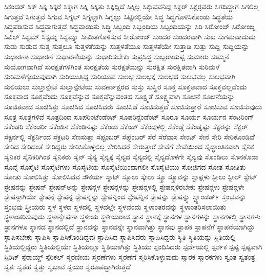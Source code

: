 {ಸಿಕಂದರ್
ಸಿಕ್
ಸಿಕ್ಕ
ಸಿಕ್ಕರೆ
ಸಿಕ್ಕಾಗ
ಸಿಕ್ಕಿ
ಸಿಕ್ಕಿತು
ಸಿಕ್ಕಿದ್ದಿದೆ
ಸಿಕ್ಕಿಲ್ಲ
ಸಿಕ್ಕುವವನಿದ್ದ
ಸಿಕ್ದರ್
ಸಿಕ್ದರ್ರವರು
ಸಿಗದಿದ್ದಾಗ
ಸಿಗಲಿಲ್ಲ
ಸಿಗುತ್ತದೆ
ಸಿಗುತ್ತವೆ
ಸಿಗುವ
ಸಿಗ್ನಲ್
ಸಿಗ್ನಲ್ಗಾಗಿ
ಸಿಗ್ನಲ್ಲು
ಸಿಟ್ಟಿನಲ್ಲಿಯೇ
ಸಿದ್ಧ
ಸಿದ್ಧಗೊಳಿಸಿಕೊಂಡು
ಸಿದ್ಧತೆಯ
ಸಿದ್ಧಪಡಿಸುವ
ಸಿದ್ಧವಾಗುತ್ತದೆ
ಸಿದ್ಧವಾಯಿತು
ಸಿದ್ಧಿ
ಸಿಬ್ಬಂದಿ
ಸಿಬ್ಬಂದಿಯ
ಸಿಬ್ಬಂದಿಯನ್ನು
ಸಿರಿ
ಸಿರೋಂಜ್
ಸಿರೋಂಜ್ನ
ಸಿವಿಲ್
ಸಿಸ್ಟಮ್
ಸಿಸ್ಟಮ್ನ
ಸಿಸ್ಟಮ್ನ್ನು
ಸೀಮಿತಗೊಳಿಸುವ
ಸೀರೋಂಜ್
ಸುಂದರ
ಸುಂದರವಾಗಿ
ಸುಖ
ಸುಗಮವಾದುದು
ಸುಡು
ಸುಡುವ
ಸುತ್ತ
ಸುತ್ತಲೂ
ಸುತ್ತಳತೆಯನ್ನು
ಸುತ್ತಳತೆಯೂ
ಸುತ್ತಳತೆಯೇ
ಸುತ್ತಾಡಿ
ಸುತ್ತು
ಸುದ್ದಿ
ಸುದ್ದಿಯನ್ನು
ಸುಧಾರಣಾ
ಸುಧಾರಣೆ
ಸುಧಾರಣೆೆಯನ್ನು
ಸುಧಾರಿಸಬೇಕು
ಸುಪ್ರಸಿದ್ಧ
ಸುಬ್ಬರಾಯಪ್ಪ
ಸುಮಾರು
ಸುಮ್ಮನೆ
ಸುಯೋಗವಾಗಿದೆ
ಸುರಕ್ಷತೆಗಳಿಗಿಂತ
ಸುರಕ್ಷತೆಯ
ಸುರಕ್ಷತೆಯನ್ನು
ಸುರಕ್ಷಿತ
ಸುರಕ್ಷಿತವಾಗಿ
ಸುರಿಮಳೆ
ಸುರಿಮಳೆಗೈಯುವುದಾಗಿ
ಸುರಿಯುತ್ತಿದ್ದ
ಸುರಿಯುವ
ಸುಲಭ
ಸುಲಭಕ್ಕೆ
ಸುಲಭದ
ಸುಲಭವಲ್ಲ
ಸುಲಭವಾಗಿ
ಸುಲಿಯಲು
ಸುಲ್ತಾನ್ಪೇಟೆ
ಸುಲ್ತಾನ್ಪೇಟೆಯ
ಸುವರ್ಣಾಕ್ಷರದ
ಸುಸ್ತು
ಸುಸ್ಥಿರ
ಸೂಕ್ತ
ಸೂಕ್ತಅವಾದ
ಸೂಕ್ತವಲ್ಲವೆಂದು
ಸೂಕ್ತವಾದ
ಸೂಕ್ತವೆಂದು
ಸೂಕ್ತವೆನ್ನುವ
ಸೂಕ್ತವೆನ್ನುವಂತಹ
ಸೂಕ್ಷ್ಮತೆ
ಸೂಕ್ಷ್ಮವಾಗಿ
ಸೂಚನೆ
ಸೂಚನೆಯನ್ನು
ಸೂಚಿತವಾದ
ಸೂಚಿಸಿತ್ತು
ಸೂಚಿಸಿದ
ಸೂಚಿಸಿದರು
ಸೂಚಿಸಿದೆ
ಸೂಚಿಸುತ್ತದೆ
ಸೂಚಿಸುತ್ತಾರೆ
ಸೂಚಿಸುವ
ಸೂಚಿಸುವುದು
ಸೂತ್ರ
ಸೂತ್ರಗಳಿವೆ
ಸೂತ್ರದಿಂದ
ಸೂಪರಿಂಟೆಂಡೆಂಟ್
ಸೂಪರಿನ್ಟೆಂಡೆಂಟ್
ಸೂರೂ
ಸೂರ್ಯ
ಸೂರ್ಯನ
ಸೆಂಟರಿಂಗ್
ಸೆಕೆಂಡರಿ
ಸೆಕೆಂಡರೀ
ಸೆಕೆಂಡಿನ
ಸೆಕೆಂಡಿನಷ್ಟು
ಸೆಕೆಂಡು
ಸೆಕೆಂಡ್
ಸೆಕೆಂಡ್ಗಳಲ್ಲಿ
ಸೆಕೆಂಡ್ಗೆ
ಸೆಕೆಂಡ್ನಷ್ಟು
ಸೆಕ್ಟರನ್ನು
ಸೆಕ್ಟರ್
ಸೆಕ್ಟರ್ನಲ್ಲಿ
ಸೆಕ್ಟರ್ನಿಂದ
ಸೆಕ್ರಟರಿ
ಸೆಣಸುತ್ತಾ
ಸೆಪ್ಟಂಬರ್
ಸೆಪ್ಟೆಂಬರ್
ಸೆರೆ
ಸೆರೆವಾಸ
ಸೇಂಟ್
ಸೇನೆ
ಸೇರಿ
ಸೇರಿಕೊಂಡಿವೆೆ
ಸೇರಿದ
ಸೇರಿದಂತೆ
ಸೇರಿದ್ದರು
ಸೇರಿಸಿಕೊಳ್ಳಲಿಲ್ಲ
ಸೇರಿಸಿದರೆ
ಸೇರುತ್ತಾರೆ
ಸೇವೆಗೆ
ಸೇವೆಯಿಂದ
ಸೈದ್ಧಾಂತಿಕವಾಗಿ
ಸೈನಿಕ
ಸೈನಿಕರ
ಸೈನಿಕರಿಗಿಂತ
ಸೈನಿಕರು
ಸೈನ್
ಸೈನ್ಯ
ಸೈನ್ಯಕ್ಕೆ
ಸೈನ್ಯದ
ಸೈನ್ಯದಲ್ಲಿ
ಸೈನ್ಯದೊಳಗೇ
ಸೈನ್ಯವು
ಸೊಂಡಿಲು
ಸೊನಕೊಡಾ
ಸೊನ್ನೆ
ಸೊಸೈಟಿ
ಸೊಸೈಟಿಗಳು
ಸೊಸೈಟಿಯ
ಸೊಸೈಟಿಯಿಂದಾಗಲೀ
ಸೊಸೈಟಿಯು
ಸೋಜಿಗದ
ಸೋತ
ಸೋತಿತು
ಸೋತು
ಸೋಲಿಸಿತ್ತು
ಸೋಲಿಸಿದವ
ಸೌಕರ್ಯ
ಸ್ಕಾಟ್
ಸ್ಕೂಲು
ಸ್ಕೇಲು
ಸ್ಕ್ರೂ
ಸ್ಕ್ರೂವನ್ನು
ಸ್ಟಾಫ್ಗಳು
ಸ್ಟೀಲು
ಸ್ಟೀಲ್
ಸ್ಟೇಟ್
ಸ್ಟೇಷನನ್ನು
ಸ್ಟೇಷನ್
ಸ್ಟೇಷನ್ಅನ್ನು
ಸ್ಟೇಷನ್ಗಳ
ಸ್ಟೇಷನ್ಗಳನ್ನು
ಸ್ಟೇಷನ್ಗಳಲ್ಲಿ
ಸ್ಟೇಷನ್ಗಳಿರಬೇಕು
ಸ್ಟೇಷನ್ಗಳು
ಸ್ಟೇಷನ್ಗಳೇ
ಸ್ಟೇಷನ್ಗಾಗಿಯೇ
ಸ್ಟೇಷನ್ಗೆ
ಸ್ಟೇಷನ್ನ
ಸ್ಟೇಷನ್ನನ್ನು
ಸ್ಟೇಷನ್ನಿಂದ
ಸ್ಟೇಷನ್ನಿನ
ಸ್ಟೇಷನ್ನು
ಸ್ಟೇಷನ್ನ್ನು
ಸ್ಟ್ಯಾಂಡರ್ಡ್
ಸ್ತಂಭವನ್ನು
ಸ್ತಂಭವು
ಸ್ತ್ರೀಯರು
ಸ್ಥಳ
ಸ್ಥಳದ
ಸ್ಥಳದಲ್ಲಿ
ಸ್ಥಳದಲ್ಲೇ
ಸ್ಥಳವೆಂದು
ಸ್ಥಳಾಂತರವನ್ನು
ಸ್ಥಳಾಂತರಿಸಲಾಯಿತು
ಸ್ಥಳಾಂತರಿಸುವುದು
ಸ್ಥಳಾನ್ವೇಷಣಾ
ಸ್ಥಳೀಯ
ಸ್ಥಳೀಯರಾದ
ಸ್ಥಾನ
ಸ್ಥಾನಕ್ಕೆ
ಸ್ಥಾನಗಳ
ಸ್ಥಾನಗಳನ್ನು
ಸ್ಥಾನಗಳಲ್ಲಿ
ಸ್ಥಾನಗಳು
ಸ್ಥಾನಗಳೂ
ಸ್ಥಾನದ
ಸ್ಥಾನದಲ್ಲಿದೆ
ಸ್ಥಾನವನ್ನು
ಸ್ಥಾನವನ್ನೇ
ಸ್ಥಾನವಾಗಿತ್ತು
ಸ್ಥಾನವು
ಸ್ಥಾಪಕ
ಸ್ಥಾಪನೆಗೆ
ಸ್ಥಾಪನೆಯಾಗಿದ್ದು
ಸ್ಥಾಪಿಸಬೇಕು
ಸ್ಥಾಪಿಸಿ
ಸ್ಥಾಪಿಸಿಕೊಂಡಿದ್ದವು
ಸ್ಥಾಪಿಸಿದ
ಸ್ಥಾಪಿಸಿದರು
ಸ್ಥಾಪಿಸಿದ್ದರು
ಸ್ಥಿತಿ
ಸ್ಥಿತಿಯನ್ನು
ಸ್ಥಿತಿಯಲ್ಲಿ
ಸ್ಥಿತಿಯಲ್ಲಿದ್ದರು
ಸ್ಥಿತಿಯಲ್ಲಿಯೇ
ಸ್ಥಿತಿಯಲ್ಲೂ
ಸ್ಥಿತಿಯಾಗಿತ್ತು
ಸ್ಥಿತಿಯು
ಸ್ಪಂದಿಸಿದರು
ಸ್ಪರ್ದೆಯಲ್ಲಿ
ಸ್ಪರ್ಶಕ
ಸ್ಪಷ್ಟ
ಸ್ಪಷ್ಟವಾಗಿ
ಸ್ಪಿರಿಟ್
ಸ್ಪೆರಾಯ್ಡ್
ಸ್ಪೆರಿಕಲ್
ಸ್ಮರಣೀಯ
ಸ್ಮರಣೆಗಳು
ಸ್ಮರಣೆಗೆ
ಸ್ಮರಿಸಿಕೊಳ್ಳುವುದು
ಸ್ಮಾರಕ
ಸ್ಮಾರಕಗಳು
ಸ್ವಂತ
ಸ್ವತಂತ್ರ
ಸ್ವತಃ
ಸ್ವತಹ
ಸ್ವತ್ತು
ಸ್ವಭಾವ
ಸ್ವಯಂ
ಸ್ವರೂಪದ್ದಾಗಿರುತ್ತದೆ
}
